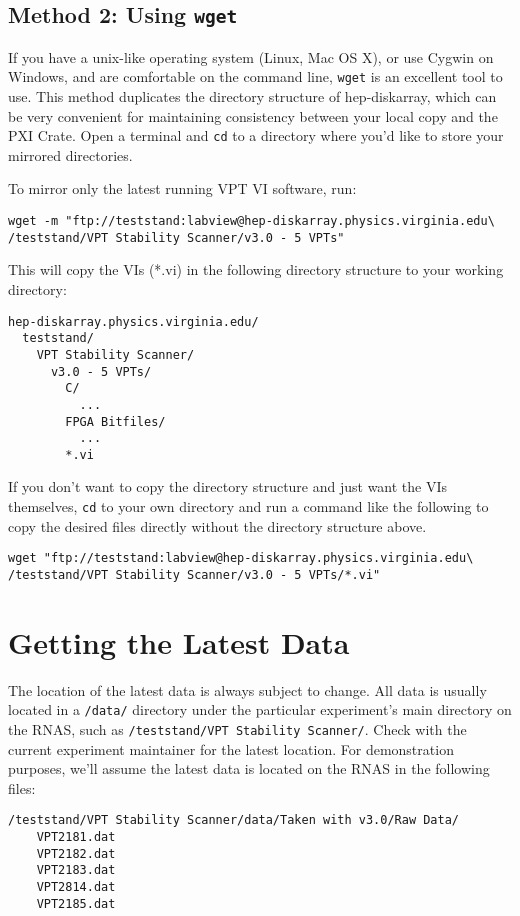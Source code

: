 \subsection{Method 2: Using \texttt{wget}}
\label{sec:op_start:vptvi:wget}

If you have a unix-like operating system (Linux, Mac OS X), or use Cygwin on Windows, and are comfortable on the command line, \texttt{wget} is an excellent tool to use.  This method duplicates the directory structure of hep-diskarray, which can be very convenient for maintaining consistency between your local copy and the \gls{PXI Crate}.  Open a terminal and \texttt{cd} to a directory where you'd like to store your mirrored directories.

To mirror only the latest running \gls{VPT VI} software, run:
\begin{verbatim}
wget -m "ftp://teststand:labview@hep-diskarray.physics.virginia.edu\
/teststand/VPT Stability Scanner/v3.0 - 5 VPTs"
\end{verbatim}

This will copy the VIs (*.vi) in the following directory structure to your working directory:
\begin{verbatim}
hep-diskarray.physics.virginia.edu/
  teststand/
    VPT Stability Scanner/
      v3.0 - 5 VPTs/
        C/
          ...
        FPGA Bitfiles/
          ...
        *.vi
\end{verbatim}

If you don't want to copy the directory structure and just want the VIs themselves, \texttt{cd} to your own directory and run a command like the following to copy the desired files directly without the directory structure above.
\begin{verbatim}
wget "ftp://teststand:labview@hep-diskarray.physics.virginia.edu\
/teststand/VPT Stability Scanner/v3.0 - 5 VPTs/*.vi"
\end{verbatim}

\section{Getting the Latest Data}
\label{sec:op_start:data}

The location of the latest data is always subject to change.  All data is usually located in a \texttt{/data/} directory under the particular experiment's main directory on the RNAS, such as \texttt{/teststand/VPT Stability Scanner/}.  Check with the current experiment maintainer for the latest location.  For demonstration purposes, we'll assume the latest data is located on the RNAS in the following files:\\
\begin{verbatim}
/teststand/VPT Stability Scanner/data/Taken with v3.0/Raw Data/
    VPT2181.dat
    VPT2182.dat
    VPT2183.dat
    VPT2814.dat
    VPT2185.dat
\end{verbatim}



